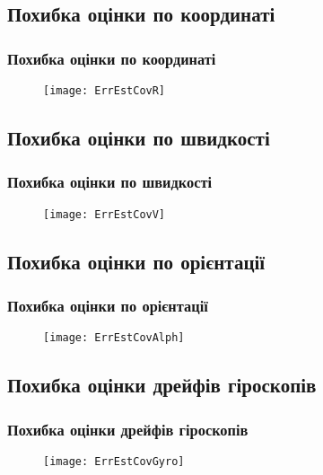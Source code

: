 \documentclass[ucs,compress]{beamer}    %
\begin{document}
\subsection{Похибка оцінки по координаті} 
\begin{frame}%
\frametitle{Похибка оцінки по координаті}
\noindent
\begin{figure}
\texttt{[image: ErrEstCovR]}
\end{figure}
\end{frame}

\subsection{Похибка оцінки по швидкості} 
\begin{frame}%
\frametitle{Похибка оцінки по швидкості}
\noindent
\begin{figure}
\texttt{[image: ErrEstCovV]}
\end{figure}
\end{frame}

\subsection{Похибка оцінки по орієнтації} 
\begin{frame}%
\frametitle{Похибка оцінки по орієнтації}
\noindent
\begin{figure}
\texttt{[image: ErrEstCovAlph]}
\end{figure}
\end{frame}

\subsection{Похибка оцінки дрейфів гіроскопів} 
\begin{frame}%
\frametitle{Похибка оцінки дрейфів гіроскопів}
\noindent
\begin{figure}
\texttt{[image: ErrEstCovGyro]}
\end{figure}
\end{frame}
\end{document}
